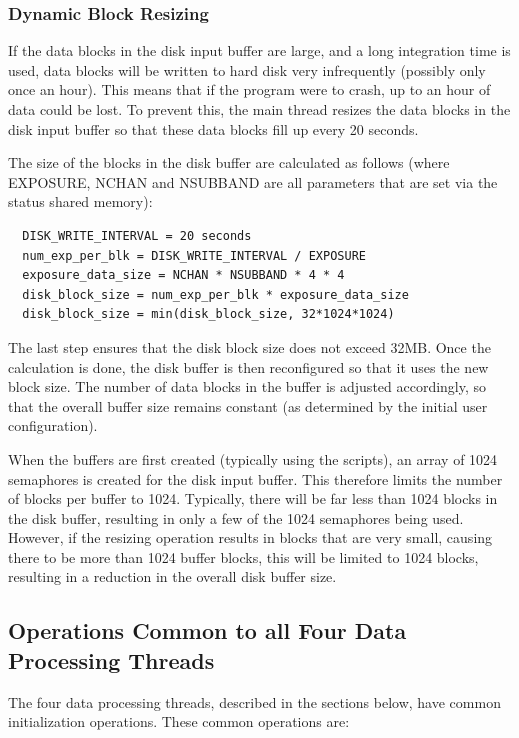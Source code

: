 \documentclass[11pt]{article} %
\begin{document}
\subsubsection{Dynamic Block Resizing}
If the data blocks in the disk input buffer are large, and a long integration time is used, data blocks will be written to hard disk very infrequently (possibly only once an hour). This means that if the program were to crash, up to an hour of data could be lost. To prevent this, the main thread resizes the data blocks in the disk input buffer so that these data blocks fill up every 20 seconds.

The size of the blocks in the disk buffer are calculated as follows (where EXPOSURE, NCHAN and NSUBBAND are all parameters that are set via the status shared memory):

\begin{verbatim}
  DISK_WRITE_INTERVAL = 20 seconds
  num_exp_per_blk = DISK_WRITE_INTERVAL / EXPOSURE
  exposure_data_size = NCHAN * NSUBBAND * 4 * 4
  disk_block_size = num_exp_per_blk * exposure_data_size
  disk_block_size = min(disk_block_size, 32*1024*1024)
\end{verbatim}

The last step ensures that the disk block size does not exceed 32MB. Once the calculation is done, the disk buffer is then reconfigured so that it uses the new block size. The number of data blocks in the buffer is adjusted accordingly, so that the overall buffer size remains constant (as determined by the initial user configuration).

When the buffers are first created (typically using the scripts), an array of 1024 semaphores is created for the disk input buffer. This therefore limits the number of blocks per buffer to 1024. Typically, there will be far less than 1024 blocks in the disk buffer, resulting in only a few of the 1024 semaphores being used. However, if the resizing operation results in blocks that are very small, causing there to be more than 1024 buffer blocks, this will be limited to 1024 blocks, resulting in a reduction in the overall disk buffer size.

\subsection{Operations Common to all Four Data Processing Threads}

The four data processing threads, described in the sections below, have common initialization operations. These common operations are:
\end{document}
